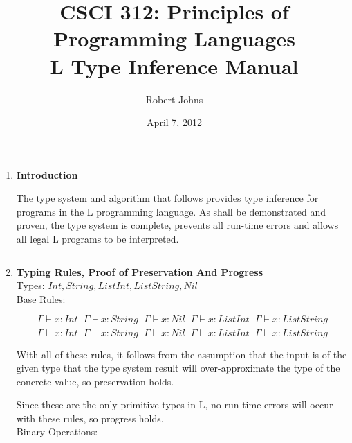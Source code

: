 \documentclass[10pt]{article} %
\title{CSCI 312: Principles of Programming Languages\\
L Type Inference Manual}
\author{Robert Johns}
\date{April 7, 2012}
\begin{document}
\maketitle
\begin{enumerate}

\item{\bf{Introduction}}

The type system and algorithm that follows provides type inference for programs in the L programming language.  As shall be demonstrated and proven, the type system is complete, prevents all run-time errors and allows all legal L programs to be interpreted.  

$$ $$

\item{\bf{Typing Rules, Proof of Preservation And Progress}}\\

Types: $Int, String, ListInt, ListString, Nil$\\

Base Rules:

$$\frac{\Gamma \vdash x : Int}{\Gamma \vdash x: Int} \:\: \frac{\Gamma \vdash x : String}{\Gamma \vdash x: String}\:\: \frac{\Gamma \vdash x : Nil}{\Gamma \vdash x: Nil}\:\: \frac{\Gamma \vdash x : ListInt}{\Gamma \vdash x: ListInt}\:\: \frac{\Gamma \vdash x : ListString}{\Gamma \vdash x: ListString}$$

With all of these rules, it follows from the assumption that the input is of the given type that the type system result will over-approximate the type of the concrete value, so preservation holds.

Since these are the only primitive types in L, no run-time errors will occur with these rules, so progress holds.\\

Binary Operations:


\end{enumerate}
\end{document}

